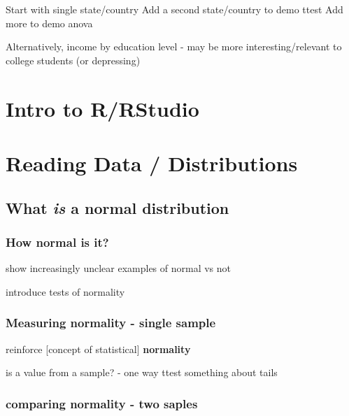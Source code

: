 \documentclass[
]{book}
\begin{document}
Start with single state/country
Add a second state/country to demo ttest
Add more to demo anova

Alternatively, income by education level - may be more interesting/relevant to college students (or depressing)

\hypertarget{intro-to-rrstudio}{%
\section{Intro to R/RStudio}\label{intro-to-rrstudio}}

\hypertarget{reading-data-distributions}{%
\section{Reading Data / Distributions}\label{reading-data-distributions}}

\hypertarget{what-is-a-normal-distribution}{%
\subsection{\texorpdfstring{What \emph{is} a \textbf{normal distribution}}{What is a normal distribution}}\label{what-is-a-normal-distribution}}

\hypertarget{how-normal-is-it}{%
\subsubsection{How normal is it?}\label{how-normal-is-it}}

show increasingly unclear examples of normal vs not

introduce tests of normality

\hypertarget{measuring-normality---single-sample}{%
\subsubsection{Measuring normality - single sample}\label{measuring-normality---single-sample}}

reinforce {[}concept of statistical{]} \textbf{normality}

is a value from a sample? - one way ttest
something about tails

\hypertarget{comparing-normality---two-saples}{%
\subsubsection{comparing normality - two saples}\label{comparing-normality---two-saples}}
\end{document}
